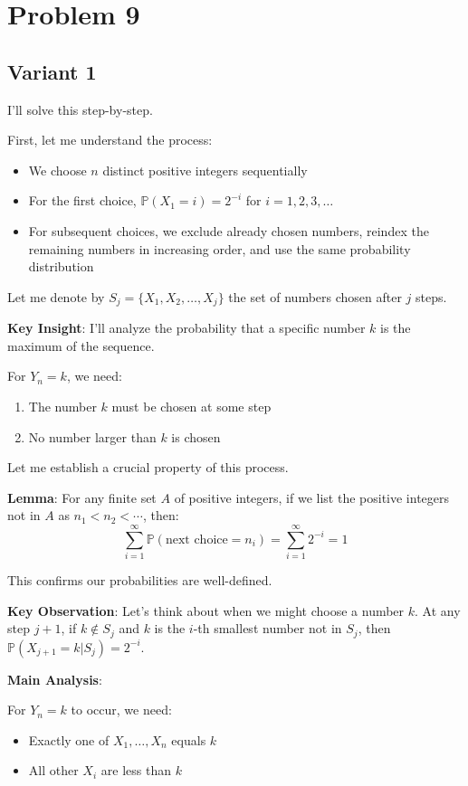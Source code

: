 \documentclass[12pt,a4paper]{article}
\theoremstyle{definition}
\begin{document}
\section{Problem 9}
\subsection{Variant 1}
    I'll solve this step-by-step.

    First, let me understand the process:
    \begin{itemize}
        \item We choose $n$ distinct positive integers sequentially
        \item For the first choice, $\mathbb{P}(X_1 = i) = 2^{-i}$ for $i = 1, 2, 3, \ldots$
        \item For subsequent choices, we exclude already chosen numbers, reindex the remaining numbers in increasing order, and use the same probability distribution
    \end{itemize}

    Let me denote by $S_j = \{X_1, X_2, \ldots, X_j\}$ the set of numbers chosen after $j$ steps.

    \textbf{Key Insight}: I'll analyze the probability that a specific number $k$ is the maximum of the sequence.

    For $Y_n = k$, we need:
    \begin{enumerate}
        \item The number $k$ must be chosen at some step
        \item No number larger than $k$ is chosen
    \end{enumerate}

    Let me establish a crucial property of this process.

    \textbf{Lemma}: For any finite set $A$ of positive integers, if we list the positive integers not in $A$ as $n_1 < n_2 < \cdots$, then:
    $$\sum_{i=1}^{\infty} \mathbb{P}(\text{next choice} = n_i) = \sum_{i=1}^{\infty} 2^{-i} = 1$$

    This confirms our probabilities are well-defined.

    \textbf{Key Observation}: Let's think about when we might choose a number $k$. At any step $j+1$, if $k \notin S_j$ and $k$ is the $i$-th smallest number not in $S_j$, then $\mathbb{P}(X_{j+1} = k | S_j) = 2^{-i}$.

    \textbf{Main Analysis}:

    For $Y_n = k$ to occur, we need:
    \begin{itemize}
        \item Exactly one of $X_1, \ldots, X_n$ equals $k$
        \item All other $X_i$ are less than $k$
    \end{itemize}
\end{document}
